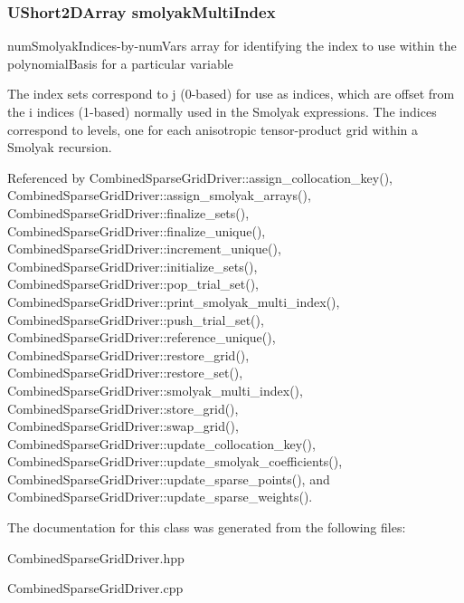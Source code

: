 \subsubsection[{\texorpdfstring{smolyak\+Multi\+Index}{smolyakMultiIndex}}]{\setlength{\rightskip}{0pt plus 5cm}U\+Short2\+D\+Array smolyak\+Multi\+Index\hspace{0.3cm}{\ttfamily [private]}}\label{classPecos_1_1CombinedSparseGridDriver_a189de9f4451d4da64b46cff2b4b1ba0d}


num\+Smolyak\+Indices-\/by-\/num\+Vars array for identifying the index to use within the polynomial\+Basis for a particular variable 

The index sets correspond to j (0-\/based) for use as indices, which are offset from the i indices (1-\/based) normally used in the Smolyak expressions. The indices correspond to levels, one for each anisotropic tensor-\/product grid within a Smolyak recursion. 

Referenced by Combined\+Sparse\+Grid\+Driver\+::assign\+\_\+collocation\+\_\+key(), Combined\+Sparse\+Grid\+Driver\+::assign\+\_\+smolyak\+\_\+arrays(), Combined\+Sparse\+Grid\+Driver\+::finalize\+\_\+sets(), Combined\+Sparse\+Grid\+Driver\+::finalize\+\_\+unique(), Combined\+Sparse\+Grid\+Driver\+::increment\+\_\+unique(), Combined\+Sparse\+Grid\+Driver\+::initialize\+\_\+sets(), Combined\+Sparse\+Grid\+Driver\+::pop\+\_\+trial\+\_\+set(), Combined\+Sparse\+Grid\+Driver\+::print\+\_\+smolyak\+\_\+multi\+\_\+index(), Combined\+Sparse\+Grid\+Driver\+::push\+\_\+trial\+\_\+set(), Combined\+Sparse\+Grid\+Driver\+::reference\+\_\+unique(), Combined\+Sparse\+Grid\+Driver\+::restore\+\_\+grid(), Combined\+Sparse\+Grid\+Driver\+::restore\+\_\+set(), Combined\+Sparse\+Grid\+Driver\+::smolyak\+\_\+multi\+\_\+index(), Combined\+Sparse\+Grid\+Driver\+::store\+\_\+grid(), Combined\+Sparse\+Grid\+Driver\+::swap\+\_\+grid(), Combined\+Sparse\+Grid\+Driver\+::update\+\_\+collocation\+\_\+key(), Combined\+Sparse\+Grid\+Driver\+::update\+\_\+smolyak\+\_\+coefficients(), Combined\+Sparse\+Grid\+Driver\+::update\+\_\+sparse\+\_\+points(), and Combined\+Sparse\+Grid\+Driver\+::update\+\_\+sparse\+\_\+weights().



The documentation for this class was generated from the following files\+:\begin{DoxyCompactItemize}
\item 
Combined\+Sparse\+Grid\+Driver.\+hpp\item 
Combined\+Sparse\+Grid\+Driver.\+cpp\end{DoxyCompactItemize}
